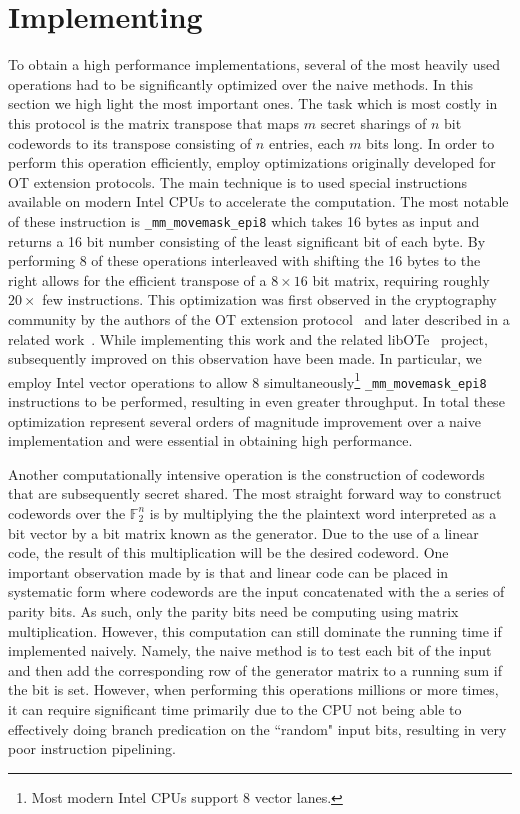 
\section{Implementing}

To obtain a high performance implementations, several of the most heavily used operations had to be significantly optimized over the naive methods. In this section we high light the most important ones. The task which is most costly in this protocol is the matrix transpose that maps $m$ secret sharings of $n$ bit codewords to its transpose consisting of $n$ entries, each $m$ bits long. In order to perform this operation efficiently, employ optimizations originally developed for OT extension protocols. The main technique is to used special instructions available on modern Intel CPUs to accelerate the computation. The most notable of these instruction is \texttt{\_mm\_movemask\_epi8} which takes 16 bytes as input and returns a 16 bit number consisting of the least significant bit of each byte. By performing 8 of these operations interleaved with shifting the 16 bytes to the right allows for the efficient transpose of a $8\times 16$ bit matrix, requiring roughly $20\times$ few instructions. This optimization was first observed in the cryptography community by the authors of the OT extension protocol~\cite{DBLP:conf/crypto/KellerOS15} and later described in a related work~\cite{DBLP:conf/ccs/KellerOS16}. While implementing this work and the related libOTe~\cite{libOTe} project, subsequently improved on this observation have been made. In particular, we employ Intel vector operations to allow 8  simultaneously\footnote{Most modern Intel CPUs support 8 vector lanes.} \texttt{\_mm\_movemask\_epi8} instructions to be performed, resulting in even greater throughput. In total these optimization represent several orders of magnitude improvement over a naive implementation and were essential in obtaining high performance.


Another computationally intensive operation is the construction of codewords that are subsequently secret shared. The most straight forward way to construct codewords over the $\mathbb{F}_2^n$ is by multiplying the the plaintext word interpreted as a bit vector by a bit matrix known as the generator. Due to the use of a linear code, the result of this multiplication will be the desired codeword. One important observation made by \cite{DBLP:conf/tcc/FrederiksenJNT16} is that and linear code can be placed in systematic form where codewords are the input concatenated with the a series of parity bits. As such, only the parity bits need be computing using matrix multiplication. However, this computation can still dominate the running time if implemented naively. Namely, the naive method is to test each bit of the input and then add the corresponding row of the generator matrix to a running sum if the bit is set. However, when performing this operations millions or more times, it can require significant time primarily due to the CPU not being able to effectively doing branch predication on the ``random" input bits, resulting in very poor instruction pipelining. 

